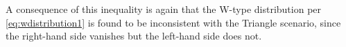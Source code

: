 A consequence of this inequality is again that the W-type distribution per \cref{eq:wdistribution1}
is found to be inconsistent with the Triangle scenario, since the right-hand side vanishes but the left-hand side does not.




